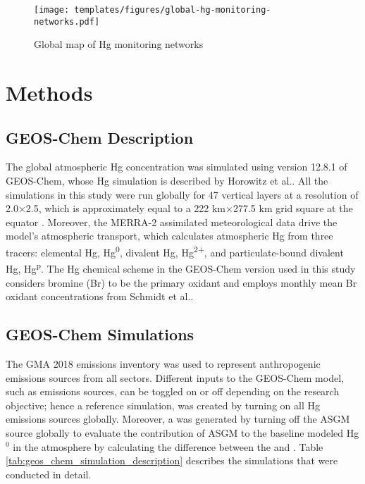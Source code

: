 \begin{figure}[H]
  \texttt{[image: templates/figures/global-hg-monitoring-networks.pdf]}
  \caption[Global map of Hg monitoring networks]{Global map of Hg monitoring networks \cite{united_nations_environment_programme_technical_2019}}
  \label{fig:global-hg-monitoring-networks}
  \centering
  
\end{figure}
\FloatBarrier






\section{Methods}\label{c2_methods}
\subsection{GEOS-Chem Description}\label{c2_geos_chem_description}
\begin{flushleft}

The global atmospheric Hg concentration was simulated using version 12.8.1 of GEOS-Chem, whose Hg simulation is described by Horowitz et al.\cite{horowitz_new_2017}. All the simulations in this study were run globally for 47 vertical layers at a resolution of 2.0$\times$2.5, which is approximately equal to a 222 km$\times$277.5 km grid square at the equator \cite{horowitz_new_2017}. Moreover, the MERRA-2 assimilated meteorological data \cite{gelaro_modern-era_2017} drive the model's atmospheric transport, which calculates atmospheric Hg from three tracers: elemental Hg, Hg\textsuperscript{0}, divalent Hg, Hg\textsuperscript{2+}, and particulate-bound divalent Hg, Hg\textsuperscript{p}. The Hg chemical scheme in the GEOS-Chem version used in this study considers bromine (Br) to be the primary \hg oxidant\cite{horowitz_new_2017} and employs monthly mean Br oxidant concentrations from Schmidt et al.\cite{schmidt_modeling_2016}. 
\end{flushleft}

\begin{flushleft}

\subsection{GEOS-Chem Simulations}\label{c2_geos_chem_simulations}

The GMA 2018 emissions inventory was used to represent anthropogenic emissions sources from all sectors\cite{steenhuisen_development_2019}. Different inputs to the GEOS-Chem model, such as emissions sources, can be toggled on or off depending on the research objective; hence a reference simulation, \on was created by turning on all Hg emissions sources globally. Moreover, a \off was generated by turning off the ASGM source globally to evaluate the contribution of ASGM to the baseline modeled Hg$^0$ in the atmosphere by calculating the difference between the \on and \off. Table \ref{tab:geos_chem_simulation_description} describes the simulations that were conducted in detail.
\end{flushleft}

